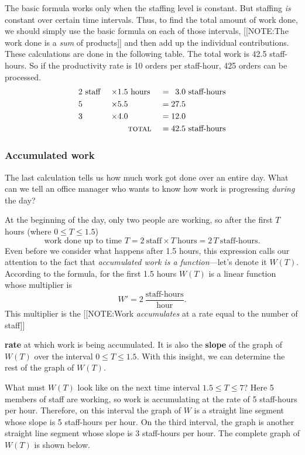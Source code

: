 The basic formula works only when the staffing level is constant.  But
staffing {\em is\/} constant over certain time intervals.  Thus, to
find the total amount of work done, we should simply use the basic
formula on each of those intervals, 
[[NOTE:The work done  is a {\em sum\/}  of products]] 
and then add up the individual contributions.  These calculations are
done in the following table.  The total work is 42.5 staff-hours.  So
if the productivity rate is 10 orders per staff-hour, 425 orders can
be processed.
\begin{alignat*}{3}
2& \text{ staff } &\times  1.5& \text{ hours } &=  
	\hphantom{0}3.0 &\text{ staff-hours} \\
5&	          &\times  5.5&                &= 27.5 & \\
3&                &\times  4.0&                &= 12.0 & \\
 &               &           & \textsc{total } &= 42.5 
                        &\text{ staff-hours}
\end{alignat*}


\subsubsection{Accumulated work} 
\label{subsubsec:accumulated-work}

	The last calculation tells us how much work got done over an entire day.  What can we tell an office manager who wants to know how work is progressing {\em during\/} the day? 

At the beginning of the day, only two people are working, so after the
first $T$ hours (where $0 \leq T \leq 1.5$)
\[
	\mbox{work done up to time $T$} = 
		2 \ \mbox{staff} \times T \ \mbox{hours} = 
		2\, T \ \mbox{staff-hours}.
\]
Even before we consider what happens after 1.5 hours, this expression
calls our attention to the fact that {\em accumulated work is a
  function\/}---let's denote it $W(T)$.  According to the formula, for
the first 1.5 hours $W(T)$ is a linear function whose multiplier is
	\[
W' = 2 \ \dfrac{\mbox{staff-hours}}{\mbox{hour}}.
\]
This multiplier is the 
[[NOTE:Work {\em accumulates\/}  at a rate equal to  the number of staff]]

{\bf rate} at which work is being
accumulated.  It is also the {\bf slope} of the graph of $W(T)$ over
the interval $0 \leq T \leq 1.5$.  With this insight, we can determine
the rest of the graph of $W(T)$.

What must $W(T)$ look like on the next time interval $1.5 \leq T \leq
7$?  Here 5 members of staff are working, so work is accumulating at
the rate of 5 staff-hours per hour.  Therefore, on this interval the
graph of $W$ is a straight line segment whose slope is 5 staff-hours
per hour.  On the third interval, the graph is another straight line
segment whose slope is 3 staff-hours per hour.  The complete graph of
$W(T)$ is shown below.


